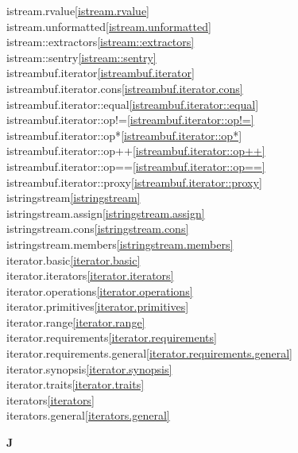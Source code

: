 \begin{multicols}{2}
istream.rvalue\quad\ref{istream.rvalue}\\
istream.unformatted\quad\ref{istream.unformatted}\\
istream::extractors\quad\ref{istream::extractors}\\
istream::sentry\quad\ref{istream::sentry}\\
istreambuf.iterator\quad\ref{istreambuf.iterator}\\
istreambuf.iterator.cons\quad\ref{istreambuf.iterator.cons}\\
istreambuf.iterator::equal\quad\ref{istreambuf.iterator::equal}\\
istreambuf.iterator::op!=\quad\ref{istreambuf.iterator::op!=}\\
istreambuf.iterator::op*\quad\ref{istreambuf.iterator::op*}\\
istreambuf.iterator::op++\quad\ref{istreambuf.iterator::op++}\\
istreambuf.iterator::op==\quad\ref{istreambuf.iterator::op==}\\
istreambuf.iterator::proxy\quad\ref{istreambuf.iterator::proxy}\\
istringstream\quad\ref{istringstream}\\
istringstream.assign\quad\ref{istringstream.assign}\\
istringstream.cons\quad\ref{istringstream.cons}\\
istringstream.members\quad\ref{istringstream.members}\\
iterator.basic\quad\ref{iterator.basic}\\
iterator.iterators\quad\ref{iterator.iterators}\\
iterator.operations\quad\ref{iterator.operations}\\
iterator.primitives\quad\ref{iterator.primitives}\\
iterator.range\quad\ref{iterator.range}\\
iterator.requirements\quad\ref{iterator.requirements}\\
iterator.requirements.general\quad\ref{iterator.requirements.general}\\
iterator.synopsis\quad\ref{iterator.synopsis}\\
iterator.traits\quad\ref{iterator.traits}\\
iterators\quad\ref{iterators}\\
iterators.general\quad\ref{iterators.general}\\
\par \textbf{J}\par

\end{multicols}
